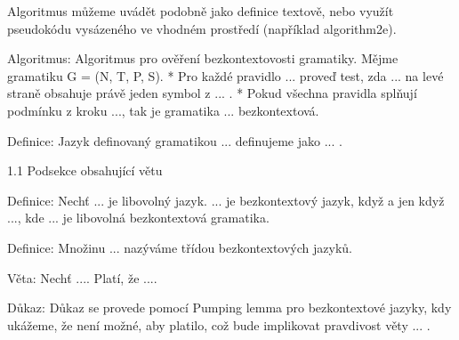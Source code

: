 \documentclass[11pt, a4paper, twocolumn]{article}
\begin{document}
	Algoritmus můžeme uvádět podobně jako definice textově, nebo využít pseudokódu vysázeného ve vhodném prostředí (například algorithm2e).

	Algoritmus: Algoritmus pro ověření bezkontextovosti gramatiky. Mějme gramatiku G = (N, T, P, S).
	 * Pro každé pravidlo ... proveď test, zda ... na levé straně obsahuje právě jeden symbol z ... .
	 * Pokud všechna pravidla splňují podmínku z kroku ..., tak je gramatika ... bezkontextová.

	Definice: Jazyk definovaný gramatikou ... definujeme jako ... .

	1.1 Podsekce obsahující větu

	Definice: Nechť ... je libovolný jazyk. ... je bezkontextový jazyk, když a jen když ..., kde ... je libovolná bezkontextová gramatika.

	Definice: Množinu ... nazýváme třídou bezkontextových jazyků.

	Věta: Nechť .... Platí, že ....

	Důkaz: Důkaz se provede pomocí Pumping lemma pro bezkontextové jazyky, kdy ukážeme, že není možné, aby platilo, což bude implikovat pravdivost věty ... .
\end{document}
